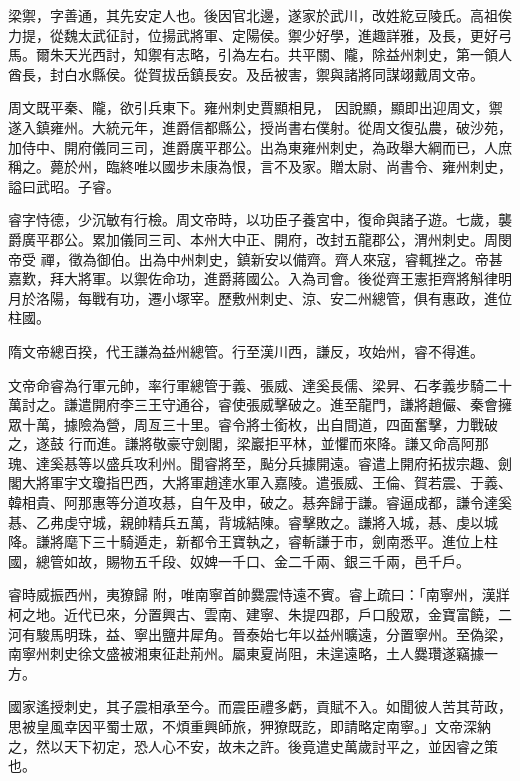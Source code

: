\begin{pinyinscope}
 梁禦，字善通，其先安定人也。後因官北邊，遂家於武川，改姓紇豆陵氏。高祖俟力提，從魏太武征討，位揚武將軍、定陽侯。禦少好學，進趣詳雅，及長，更好弓馬。爾朱天光西討，知禦有志略，引為左右。共平關、隴，除益州刺史，第一領人酋長，封白水縣侯。從賀拔岳鎮長安。及岳被害，禦與諸將同謀翊戴周文帝。



 周文既平秦、隴，欲引兵東下。雍州刺史賈顯相見，
 因說顯，顯即出迎周文，禦遂入鎮雍州。大統元年，進爵信都縣公，授尚書右僕射。從周文復弘農，破沙苑，加侍中、開府儀同三司，進爵廣平郡公。出為東雍州刺史，為政舉大綱而已，人庶稱之。薨於州，臨終唯以國步未康為恨，言不及家。贈太尉、尚書令、雍州刺史，謚曰武昭。子睿。



 睿字恃德，少沉敏有行檢。周文帝時，以功臣子養宮中，復命與諸子遊。七歲，襲爵廣平郡公。累加儀同三司、本州大中正、開府，改封五龍郡公，渭州刺史。周閔帝受
 禪，徵為御伯。出為中州刺史，鎮新安以備齊。齊人來寇，睿輒挫之。帝甚嘉歎，拜大將軍。以禦佐命功，進爵蔣國公。入為司會。後從齊王憲拒齊將斛律明月於洛陽，每戰有功，遷小塚宰。歷敷州刺史、涼、安二州總管，俱有惠政，進位柱國。



 隋文帝總百揆，代王謙為益州總管。行至漢川西，謙反，攻始州，睿不得進。



 文帝命睿為行軍元帥，率行軍總管于義、張威、達奚長儒、梁昇、石孝義步騎二十萬討之。謙遣開府李三王守通谷，睿使張威擊破之。進至龍門，謙將趙儼、秦會擁眾十萬，據險為營，周亙三十里。睿令將士銜枚，出自間道，四面奮擊，力戰破之，遂鼓
 行而進。謙將敬豪守劍閣，梁巖拒平林，並懼而來降。謙又命高阿那瑰、達奚惎等以盛兵攻利州。聞睿將至，颭分兵據開遠。睿遣上開府拓拔宗趣、劍閣大將軍宇文瓊指巴西，大將軍趙達水軍入嘉陵。遣張威、王倫、賀若震、于義、韓相貴、阿那惠等分道攻惎，自午及申，破之。惎奔歸于謙。睿逼成都，謙令達奚惎、乙弗虔守城，親帥精兵五萬，背城結陳。睿擊敗之。謙將入城，惎、虔以城降。謙將麾下三十騎遁走，新都令王寶執之，睿斬謙于市，劍南悉平。進位上柱國，總管如故，賜物五千段、奴婢一千口、金二千兩、銀三千兩，邑千戶。



 睿時威振西州，夷獠歸
 附，唯南寧首帥爨震恃遠不賓。睿上疏曰：「南寧州，漢牂柯之地。近代已來，分置興古、雲南、建寧、朱提四郡，戶口殷眾，金寶富饒，二河有駿馬明珠，益、寧出鹽井犀角。晉泰始七年以益州曠遠，分置寧州。至偽梁，南寧州刺史徐文盛被湘東征赴荊州。屬東夏尚阻，未遑遠略，土人爨瓚遂竊據一方。



 國家遙授刺史，其子震相承至今。而震臣禮多虧，貢賦不入。如聞彼人苦其苛政，思被皇風幸因平蜀士眾，不煩重興師旅，狎獠既訖，即請略定南寧。」文帝深納之，然以天下初定，恐人心不安，故未之許。後竟遣史萬歲討平之，並因睿之策也。




\end{pinyinscope}
